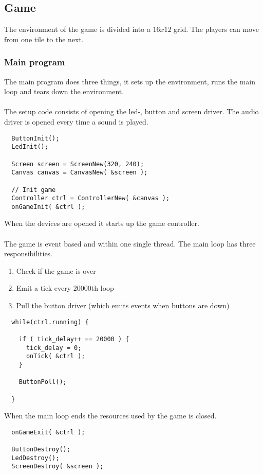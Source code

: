 \subsection{Game}

The environment of the game is divided into a $16x12$ grid. The players can move from one tile
to the next.

\subsubsection{Main program}

The main program does three things, it sets up the environment, runs the main loop and tears down the environment.\\
\\
The setup code consists of opening the led-, button and screen driver. The audio driver is opened every
time a sound is played.
\begin{lstlisting}
  ButtonInit();
  LedInit();

  Screen screen = ScreenNew(320, 240);
  Canvas canvas = CanvasNew( &screen );

  // Init game
  Controller ctrl = ControllerNew( &canvas );
  onGameInit( &ctrl );
\end{lstlisting}
When the devices are opened it starts up the game controller.\\
\\
The game is event based and within one single thread. The main loop has three responsibilities.
\begin{enumerate}
\item Check if the game is over
\item Emit a tick every 20000th loop
\item Pull the button driver (which emits events when buttons are down)
\end{enumerate}
\begin{lstlisting}
  while(ctrl.running) {

    if ( tick_delay++ == 20000 ) {
      tick_delay = 0;
      onTick( &ctrl );
    }

    ButtonPoll();

  }
\end{lstlisting}

When the main loop ends the resources used by the game is closed.
\begin{lstlisting}
  onGameExit( &ctrl );

  ButtonDestroy();
  LedDestroy();
  ScreenDestroy( &screen );
\end{lstlisting}

